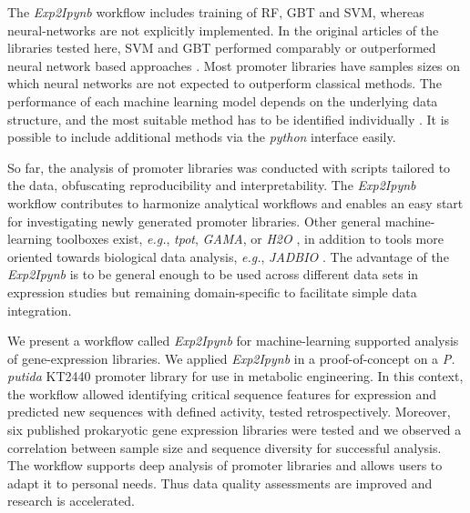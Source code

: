 \documentclass[utf8]{frontiersSCNS} %
\begin{document}
The \textit{Exp2Ipynb} workflow includes training of RF, GBT and SVM, whereas neural-networks are not explicitly implemented. In the original articles of the libraries tested here, SVM and GBT performed comparably or outperformed neural network based approaches \citep{Meng2017, Zhao2020}. Most promoter libraries have samples sizes on which neural networks are not expected to outperform classical methods. The performance of each machine learning model depends on the underlying data structure, and the most suitable method has to be identified individually \citep{wolpert1997no}. It is possible to include additional methods via the \textit{python} interface easily. 

So far, the analysis of promoter libraries was conducted with scripts tailored to the data, obfuscating reproducibility and interpretability. The \textit{Exp2Ipynb} workflow contributes to harmonize analytical workflows and enables an easy start for investigating newly generated promoter libraries. Other general machine-learning toolboxes exist, \textit{e.g.}, \textit{tpot}, \textit{GAMA}, or \textit{H2O} \citep{Truong2019}, in addition to tools more oriented towards biological data analysis, \textit{e.g.}, \textit{JADBIO} \citep{Tsamardinos2020}. The advantage of the \textit{Exp2Ipynb} is to be general enough to be used across different data sets in expression studies but remaining domain-specific to facilitate simple data integration. 


We present a workflow called \textit{Exp2Ipynb} for machine-learning supported analysis of gene-expression libraries. We applied \textit{Exp2Ipynb} in a proof-of-concept on a \textit{P.\,putida} KT2440 promoter library for use in metabolic engineering. In this context, the workflow allowed identifying critical sequence features for expression and predicted new sequences with defined activity, tested retrospectively. Moreover, six published prokaryotic gene expression libraries were tested and we observed a correlation between sample size and sequence diversity for successful analysis. The workflow supports deep analysis of promoter libraries and allows users to adapt it to personal needs. Thus data quality assessments are improved and research is accelerated.
\end{document}
